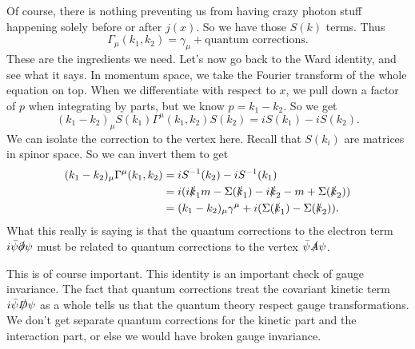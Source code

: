 \documentclass[a4paper]{article}
\begin{document}
\begin{center}
\end{center}
Of course, there is nothing preventing us from having crazy photon stuff happening solely before or after $j(x)$. So we have those $S(k)$ terms. Thus
\[
  \Gamma_\mu(k_1, k_2) = \gamma_\mu + \text{quantum corrections}.
\]
These are the ingredients we need. Let's now go back to the Ward identity, and see what it says. In momentum space, we take the Fourier transform of the whole equation on top. When we differentiate with respect to $x$, we pull down a factor of $p$ when integrating by parts, but we know $p = k_1 - k_2$. So we get
\[
  (k_1 - k_2)_\mu S(k_1) \Gamma^\mu (k_1, k_2) S(k_2) = i S(k_1) - i S(k_2).
\]
We can isolate the correction to the vertex here. Recall that $S(k_i)$ are matrices in spinor space. So we can invert them to get
\begin{align*}
  (k_1 - k_2)_\mu \Gamma^\mu(k_1, k_2) &= i S^{-1}(k_2) - i S^{-1}(k_1)\\
  &= i (i \slashed{k}_1 m - \Sigma(\slashed{k}_1) - i \slashed{k}_2 - m + \Sigma(\slashed{k}_2))\\
  &= (k_1  - k_2)_\mu \gamma^\mu + i (\Sigma(\slashed{k}_1) - \Sigma(\slashed{k}_2)).
\end{align*}
What this really is saying is that the quantum corrections to the electron term $i \bar\psi \slashed \partial \psi$ must be related to quantum corrections to the vertex $\bar\psi \slashed{A} \psi$.

This is of course important. This identity is an important check of gauge invariance. The fact that quantum corrections treat the covariant kinetic term $i \bar\psi \slashed D \psi$ as a whole tells us that the quantum theory respect gauge transformations. We don't get separate quantum corrections for the kinetic part and the interaction part, or else we would have broken gauge invariance.
\end{document}
